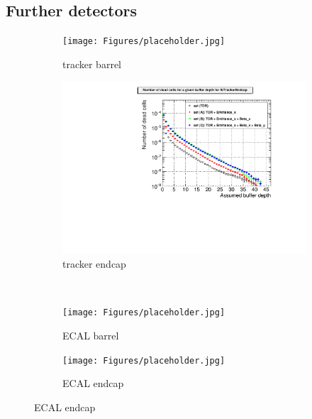  \subsection{Further \sid detectors}
    \begin{figure}
 \centering
   \begin{subfigure}[b]{0.49\textwidth}
   \centering
    \texttt{[image: Figures/placeholder.jpg]}
   \caption{\sid tracker barrel}
   \end{subfigure}
   \hfill
    \begin{subfigure}[b]{0.49\textwidth}
   \centering
    \includegraphics[width=\textwidth]{Figures/Pairs/Appendix/Occupancy_Comparison_All_layers_deadcells_ILC250_ALL_SETS_SiTrackerEndcap.pdf}
   \caption{\sid tracker endcap}
   \end{subfigure}\\
  \begin{subfigure}[b]{0.49\textwidth}
   \centering
     \texttt{[image: Figures/placeholder.jpg]}
   \caption{\sid ECAL barrel}
   \end{subfigure}
   \hfill
    \begin{subfigure}[b]{0.49\textwidth}
   \centering
    \texttt{[image: Figures/placeholder.jpg]}
   \caption{\sid ECAL endcap}
   \end{subfigure}
  \end{figure}

